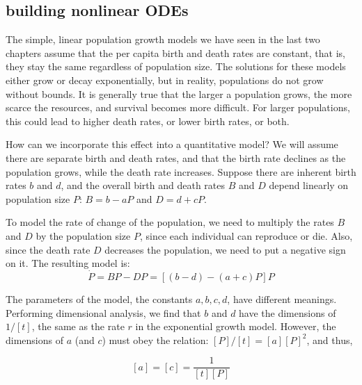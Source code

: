\documentclass[
  letterpaper,
  DIV=11,
  numbers=noendperiod]{scrreprt}
\begin{document}
\hypertarget{building-nonlinear-odes}{%
\subsection{building nonlinear ODEs}\label{building-nonlinear-odes}}

\label{sec:model16}

The simple, linear population growth models we have seen in the last two
chapters assume that the per capita birth and death rates are constant,
that is, they stay the same regardless of population size. The solutions
for these models either grow or decay exponentially, but in reality,
populations do not grow without bounds. It is generally true that the
larger a population grows, the more scarce the resources, and survival
becomes more difficult. For larger populations, this could lead to
higher death rates, or lower birth rates, or both.

How can we incorporate this effect into a quantitative model? We will
assume there are separate birth and death rates, and that the birth rate
declines as the population grows, while the death rate increases.
Suppose there are inherent birth rates \(b\) and \(d\), and the overall
birth and death rates \(B\) and \(D\) depend linearly on population size
\(P\): \(B = b - aP\) and \(D = d + cP\).

To model the rate of change of the population, we need to multiply the
rates \(B\) and \(D\) by the population size \(P\), since each
individual can reproduce or die. Also, since the death rate \(D\)
decreases the population, we need to put a negative sign on it. The
resulting model is: \[ \dot P = BP - DP = [(b-d)-(a+c)P]P \]

The parameters of the model, the constants \(a,b,c,d\), have different
meanings. Performing  dimensional analysis,
we find that \(b\) and \(d\) have the dimensions of \(1/[t]\), the same
as the rate \(r\) in the exponential growth model. However, the
dimensions of \(a\) (and \(c\)) must obey the relation:
\([P]/[t] = [a][P]^2\), and thus,

\[[a]=[c] = \frac{1}{[t][P]}\]
\end{document}
